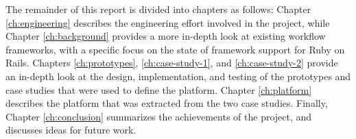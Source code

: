 \documentclass[document.tex]{subfiles}
\begin{document}
The remainder of this report is divided into chapters as follows: Chapter \ref{ch:engineering} describes the engineering effort involved in the project, while Chapter \ref{ch:background} provides a more in-depth look at existing workflow frameworks, with a specific focus on the state of framework support for Ruby on Rails.
Chapters \ref{ch:prototypes}, \ref{ch:case-study-1}, and \ref{ch:case-study-2} provide an in-depth look at the design, implementation, and testing of the prototypes and case studies that were used to define the platform.
Chapter \ref{ch:platform} describes the platform that was extracted from the two case studies.
Finally, Chapter \ref{ch:conclusion} summarizes the achievements of the project, and discusses ideas for future work.
\end{document}
